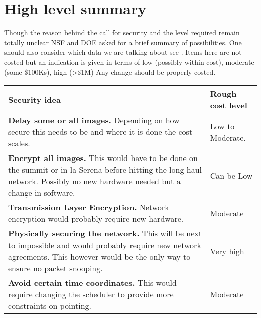 \section{High level summary}\label{sec:sum}
Though the reason behind the call for security and the level required remain totally unclear
NSF and DOE asked for a brief summary of possibilities.
One should also consider which data we are talking about see .
Items here are not costed but an indication is given in terms of low (possibly within cost), moderate (some \$100Ks), high (>\$1M)
Any change should be properly costed.


\begin{longtable}{l p{}}\hline
\textbf{Security idea} & \textbf{Rough cost level}  \\\hline
 {\bf Delay some or all images.} Depending on how secure this needs to be and where it is done the cost scales.  & Low to Moderate. \\\hline
{\bf Encrypt all images.} This would have to be done on the summit or in la Serena before hitting the long haul network. Possibly no new hardware needed but a change in software.  & Can be Low \\\hline
{\bf Transmission Layer Encryption.} Network encryption would probably require new hardware. & Moderate \\\hline
{\bf Physically securing the network.} This will be next to impossible and would probably require new network agreements. This however would be the only way to ensure no packet snooping. & Very high \\\hline
{\bf Avoid certain time coordinates.} This would require changing the scheduler to provide more constraints on pointing. &  Moderate  \\\hline
\end{longtable}
